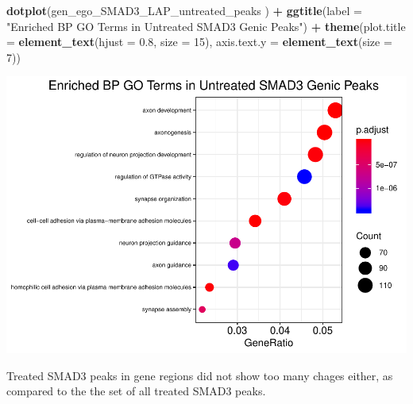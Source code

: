 \documentclass[]{article}
\newenvironment{Shaded}{\begin{snugshade}}{\end{snugshade}}
\newcommand{\DataTypeTok}[1]{\textcolor[rgb]{0.13,0.29,0.53}{#1}}
\newcommand{\DecValTok}[1]{\textcolor[rgb]{0.00,0.00,0.81}{#1}}
\newcommand{\FloatTok}[1]{\textcolor[rgb]{0.00,0.00,0.81}{#1}}
\newcommand{\KeywordTok}[1]{\textcolor[rgb]{0.13,0.29,0.53}{\textbf{#1}}}
\newcommand{\NormalTok}[1]{#1}
\newcommand{\OperatorTok}[1]{\textcolor[rgb]{0.81,0.36,0.00}{\textbf{#1}}}
\newcommand{\StringTok}[1]{\textcolor[rgb]{0.31,0.60,0.02}{#1}}
\begin{document}
\clearpage{}

\begin{Shaded}
\begin{Highlighting}[]
\KeywordTok{dotplot}\NormalTok{(gen_ego_SMAD3_LAP_untreated_peaks ) }\OperatorTok{+}\StringTok{ }\KeywordTok{ggtitle}\NormalTok{(}\DataTypeTok{label =} \StringTok{"Enriched BP GO Terms in Untreated SMAD3 Genic Peaks"}\NormalTok{) }\OperatorTok{+}\StringTok{ }\KeywordTok{theme}\NormalTok{(}\DataTypeTok{plot.title =} \KeywordTok{element_text}\NormalTok{(}\DataTypeTok{hjust =} \FloatTok{0.8}\NormalTok{, }\DataTypeTok{size =} \DecValTok{15}\NormalTok{), }\DataTypeTok{axis.text.y =} \KeywordTok{element_text}\NormalTok{(}\DataTypeTok{size =} \DecValTok{7}\NormalTok{))}
\end{Highlighting}
\end{Shaded}

\includegraphics{peak_annotation_go_term_analysis_files/figure-latex/unnamed-chunk-23-1.pdf}

\clearpage{}

Treated SMAD3 peaks in gene regions did not show too many chages either,
as compared to the the set of all treated SMAD3 peaks.
\end{document}
